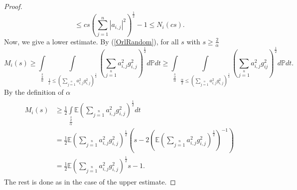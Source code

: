 \documentclass[12pt,a4paper]{article}
\newcommand{\Pv}{\mathbb{P}}
\newcommand{\Ex}{\mathbb{E}}
\begin{document}
\begin{proof}
$$\leq c s \left(\sum_{j=1}^{n}|a_{i,j}|^{2}\right)^{\frac{1}{2}}-1
\leq N_{i}(cs).
$$
Now, we give a lower estimate. By (\ref{OrlRandom}), for all
$s$ with $s\geq\frac{2}{\alpha}$
$$
M_i(s)\geq\int\limits_{\frac{2}{\alpha}}\limits^s\int\limits_{\frac{1}{t}\leq\left(\sum\limits_{j=1}\limits^na_{i,j}^2g_{i,j}^2\right)^{\frac{1}{2}}}\left(\sum\limits_{j=1}\limits^na_{i,j}^2g_{i,j}^2\right)^{\frac{1}{2}}d\Pv dt
\geq\int\limits_{\frac{2}{\alpha}}\limits^s\int\limits_{\frac{\alpha}{2}
	\leq\left(\sum\limits_{j=1}\limits^na_{i,j}^2g_{i,j}^2\right)^{\frac{1}{2}}}\left(\sum\limits_{j=1}\limits^na_{i,j}^2g_{ij}^2\right)^{\frac{1}{2}}d\Pv dt.
$$
By the definition of $\alpha$
\begin{eqnarray*}
	\left.\begin{split}
	M_{i}(s)	&\geq \frac{1}{2}\int\limits_{\frac{2}{\alpha}}\limits^s\Ex\left(\sum\limits_{j=1}\limits^{n}a_{i,j}^2g_{i,j}^2\right)^{\frac{1}{2}}dt\\
	&=\frac{1}{2}\Ex\left(\sum\limits_{j=1}\limits^{n}a_{i,j}^2g_{i,j}^2\right)^{\frac{1}{2}}\left(s-2\left(\Ex\left(\sum\limits_{j=1}\limits^{n}a_{i,j}^2g_{i,j}^2\right)^{\frac{1}{2}}\right)^{-1}\right)\\
	&=\frac{1}{2}\Ex\left(\sum\limits_{j=1}\limits^{n}a_{i,j}^2g_{i,j}^2\right)^{\frac{1}{2}}s-1.
	\end{split}\right.
\end{eqnarray*}
The rest is done as in the case of the upper estimate.
\end{proof}
\vskip 3mm





















 























\end{document}

